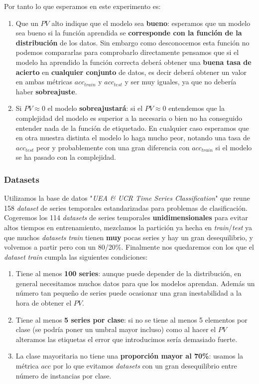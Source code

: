 Por tanto lo que esperamos en este experimento es:

\begin{enumerate}
  \item Que un $PV$ alto indique que el modelo sea \textbf{bueno}: esperamos que un modelo sea bueno si la función aprendida se \textbf{corresponde con la función de la distribución} de los datos. Sin embargo como desconocemos esta función no podemos compararlas para comprobarlo directamente pensamos que si el modelo ha aprendido la función correcta deberá obtener una \textbf{buena tasa de acierto} en \textbf{cualquier conjunto} de datos, es decir deberá obtener un valor en ambas métricas $acc_{train}$ y $acc_{test}$ y ser muy iguales, ya que no debería haber \textbf{sobreajuste}.

  \item Si $PV \approx 0$ el modelo \textbf{sobreajustará}: si el $PV \approx 0$ entendemos que la complejidad del modelo es superior a la necesaria o bien no ha conseguido entender nada de la función de etiquetado. En cualquier caso esperamos que en otra muestra distinta el modelo lo haga mucho peor, notando una tasa de $acc_{test}$ peor y probablemente con una gran diferencia con $acc_{train}$ si el modelo se ha pasado con la complejidad.
\end{enumerate}

\subsubsection{Datasets}

Utilizamos la base de datos "\emph{UEA \& UCR Time Series Classification}" \cite{bagnall2020ts} que reune 158 \emph{dataset} de series temporales estandarizadas para problemas de clasificación. Cogeremos los 114 \emph{datasets} de series temporales \textbf{unidimensionales} para evitar altos tiempos en entrenamiento, mezclamos la partición ya hecha en \emph{train}/\emph{test} ya que muchos \emph{datasets} \emph{train} tienen \textbf{muy} pocas series y hay un gran desequilibrio, y volvemos a partir pero con un 80/20\%. Finalmente nos quedaremos con los que el \emph{dataset} \emph{train} cumpla las siguientes condiciones:

\begin{enumerate}
  \item Tiene al menos \textbf{100 series}: aunque puede depender de la distribución, en general necesitamos muchos datos para que los modelos aprendan. Además un número tan pequeño de series puede ocasionar una gran inestabilidad a la hora de obtener el $PV$.
  \item Tiene al menos \textbf{5 series por clase}: si no se tiene al menos 5 elementos por clase (se podría poner un umbral mayor incluso) como al hacer el $PV$ alteramos las etiquetas el error que introducimos sería demasiado fuerte.
  \item La clase mayoritaria no tiene una \textbf{proporción mayor al 70\%}: usamos la métrica $acc$ por lo que evitamos \emph{datasets} con un gran desequilibrio entre número de instancias por clase.
\end{enumerate}

